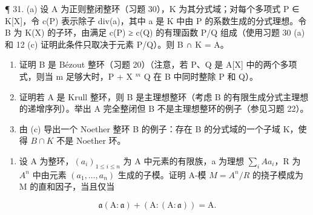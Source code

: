 ¶ 31. (a) 设 A 为正则整闭整环（习题 30），K 为其分式域；对每个多项式 P ∈ K{[}X{]}，令 c(P) 表示除子 div(a)，其中 a 是 K 中由 P 的系数生成的分式理想。令 B 为 K(X) 的子环，由满足 c(P) ≥ c(Q) 的有理函数 P/Q 组成（使用习题 30 (a) 和 12 (c) 证明此条件只取决于元素 P/Q）。则 B ∩ K = A。

\begin{enumerate}
\def\labelenumi{(\alph{enumi})}
\setcounter{enumi}{1}
\item
  证明 B 是 Bézout 整环（习题 20）（注意，若 P、Q 是 A{[}X{]} 中的两个多项式，则当 m 足够大时，P + X \(^{m}\) Q 在 B 中同时整除 P 和 Q）。
\item
  证明若 A 是 Krull 整环，则 B 是主理想整环（考虑 B 的有限生成分式主理想的递增序列）。举出 A 完全整闭但 B 不是主理想整环的例子（参见习题 22）。
\item
  由 (c) 导出一个 Noether 整环 B 的例子：存在 B 的分式域的一个子域 K，使得 \(B \cap K\) 不是 Noether 环。
\end{enumerate}

\begin{enumerate}
\def\labelenumi{\arabic{enumi}.}
\setcounter{enumi}{31}
\tightlist
\item
  设 A 为整环，\((a_{i})_{1 \leqslant i \leqslant n}\) 为 A 中元素的有限族，a 为理想 \(\sum_{i} A a_{i}\)，R 为 \(A^{n}\) 中由元素 \((a_{1}, \ldots, a_{n})\) 生成的子模。证明 A-模 \(M = A^{n}/R\) 的挠子模成为 M 的直和因子，当且仅当
\end{enumerate}

\[
\mathfrak {a} (\mathrm{A}: \mathfrak {a}) + (\mathrm{A}: (\mathrm{A}: \mathfrak {a})) = \mathrm{A}.
\]

